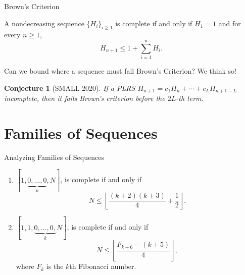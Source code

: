 \documentclass{beamer}
\newtheorem*{conjecture}{Conjecture}
\begin{document}
\begin{frame}{Brown's Criterion}
    \begin{theorem}[Brown]
    A nondecreasing sequence $\{H_i\}_{i \ge 1}$ is complete if and only if $H_1 = 1$ and for every $n \ge 1$,\vspace{-0.1in}
        \[
            H_{n + 1} \leq 1 + \sum_{i = 1}^{n} H_i.
        \]
    \end{theorem}
    \pause
    \bigskip
    Can we bound where a sequence must fail Brown's Criterion?
    \pause We think so!
    \bigskip
    \begin{conjecture}[SMALL 2020]
        If a PLRS $H_{n + 1} = c_1 H_n + \cdots + c_L H_{n + 1 - L}$ incomplete, then it fails Brown's criterion before the $2L$-th term.
    \end{conjecture}
\end{frame}

\section{Families of Sequences}

\begin{frame}{Analyzing Families of Sequences}
    \begin{theorem}[SMALL 2020]
        \begin{enumerate}
        \item     $[1, \underbrace{0, \ldots, 0}_k, N]$, is complete if and only if \vspace{-0.2in}
            \[
            N \leq \left\lfloor \frac{(k + 2)(k + 3)}{4} + \frac{1}{2} \right\rfloor.
            \]
        \item $[1, 1, \underbrace{0, \ldots, 0,}_k N]$, is complete if and only if
        \vspace{-0.2in}
            \[
            N\leq \left\lfloor\frac{F_{k+6}-(k+5)}{4}\right\rfloor,
            \]
            where $F_k$ is the $k$th Fibonacci number.
        \end{enumerate}
    \end{theorem}
     
\end{frame} 
\end{document}
